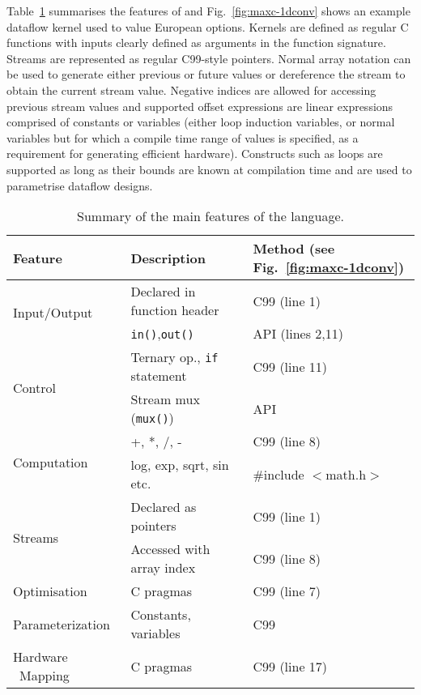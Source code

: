 Table~\ref{table:maxc-features} summarises the features of \FAST{} and
Fig.~\ref{fig:maxc-1dconv} shows an example dataflow kernel used to
value European options. Kernels are defined as regular C functions
with inputs clearly defined as arguments in the function
signature. Streams are represented as regular C99-style pointers.
Normal array notation can be used to generate either previous or
future values or dereference the stream to obtain the current stream
value. Negative indices are allowed for accessing previous stream
values and supported offset expressions are linear expressions
comprised of constants or variables (either loop induction variables,
or normal variables but for which a compile time range of values is
specified, as a requirement for generating efficient
hardware). Constructs such as loops are supported as long as their
bounds are known at compilation time and are used to parametrise
dataflow designs.

\begin{table}[!h]
  \centering
\renewcommand{\arraystretch}{1.6}
\caption{Summary of the main features of the \FAST{} language.}
\label{table:maxc-features}
\begin{tabular}{p{1.7cm}|l|l}
\hline
\bf{Feature}                   & \bf{Description}                   & \bf{Method (see Fig.~\ref{fig:maxc-1dconv})} \\
\hline\hline
  \multirow{2}{*}{Input/Output}         & Declared in function header          & C99 (line 1)                                 \\\cline{2-3}       & \texttt{in()},\texttt{out()}  & \FAST{} API (lines 2,11) \\
\hline
  \multirow{2}{*}{Control}     & Ternary op., \texttt{if} statement & C99 (line 11)                                \\\cline{2-3}      & Stream mux (\texttt{mux()})       & \FAST{} API  \\
\hline
\multirow{2}{*}{Computation} & +, *, /, -                         & C99 (line 8)                           \\\cline{2-3} & log, exp, sqrt, sin etc.  & \#include $<$math.h$>$  \\
\hline
  \multirow{2}{*}{Streams}     & Declared as pointers               & C99 (line 1)                                 \\\cline{2-3}       & Accessed with array index & C99 (line 8) \\
\hline
  Optimisation                 & C pragmas                   & C99 (line 7)                                 \\
\hline
  Parameterization             & Constants, variables                   & C99                                          \\
\hline
Hardware \  Mapping                  & C pragmas                   & C99 (line 17)                                \\
\end{tabular}
\end{table}



